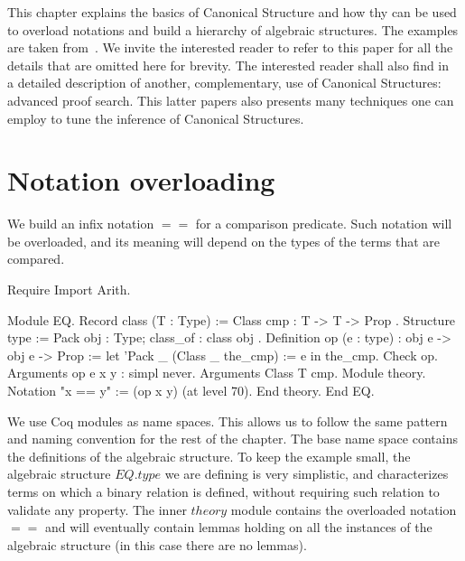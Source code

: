 
\label{CS-full}

This chapter explains the basics of Canonical Structure and how thy can be used
to overload notations and build a hierarchy of algebraic structures.
The examples are taken from~\cite{CSwcu}.  We invite the interested reader
to refer to this paper for all the details that are omitted here for brevity.
The interested reader shall also find in~\cite{CSlessadhoc} a detailed
description of another, complementary, use of Canonical Structures:
advanced proof search.  This latter papers also presents many techniques one
can employ to tune the inference of Canonical Structures.

\section{Notation overloading}

We build an infix notation $==$ for a comparison predicate.  Such notation
will be overloaded, and its meaning will depend on the types of the terms
that are compared.

\begin{coq_eval}
Require Import Arith.
\end{coq_eval}

\begin{coq_example}
Module EQ.
  Record class (T : Type) := Class { cmp : T -> T -> Prop }.
  Structure type := Pack { obj : Type; class_of : class obj }.
  Definition op (e : type) : obj e -> obj e -> Prop :=
    let 'Pack _ (Class _ the_cmp) := e in the_cmp.
  Check op.
  Arguments op {e} x y : simpl never.
  Arguments Class {T} cmp.
  Module theory.
    Notation "x == y" := (op x y) (at level 70).
  End theory.
End EQ.
\end{coq_example}

We use Coq modules as name spaces.  This allows us to follow the same pattern
and naming convention for the rest of the chapter.  The base name space
contains the definitions of the algebraic structure.  To keep the example
small, the algebraic structure $EQ.type$ we are defining is very simplistic,
and characterizes terms on which a binary relation is defined, without
requiring such relation to validate any property.
The inner $theory$ module contains the overloaded notation $==$ and
will eventually contain lemmas holding on all the instances of the
algebraic structure (in this case there are no lemmas).


